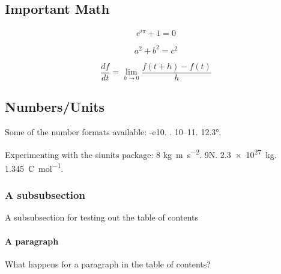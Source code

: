 \subsection{Important Math}

\begin{equation}
    e^{i\pi}+1=0
    \label{eq:euler}
\end{equation}

\begin{equation}
    a^2+b^2=c^2
    \label{eq:pythagorean}
\end{equation}

\begin{equation}
    \frac{df}{dt} = \lim_{h\rightarrow 0} \frac{f(t+h)-f(t)}{h}
    \label{eq:calculus}
\end{equation}

\subsection{Numbers/Units}
Some of the number formats available: \num{-e10}. . \numrange{10}{11}. \ang{12.3}.

Experimenting with the siunits package: 8 \unit{\kilo\gram\metre\per\square\second}. 9\unit{\newton}. \qty{2.3e27}{\kilogram}. \qty[per-mode = fraction]{1,345}{\coulomb\per\mole}.

\subsubsection{A subsubsection} 
A subsubsection for testing out the table of contents

\paragraph{A paragraph}
What happens for a paragraph in the table of contents?